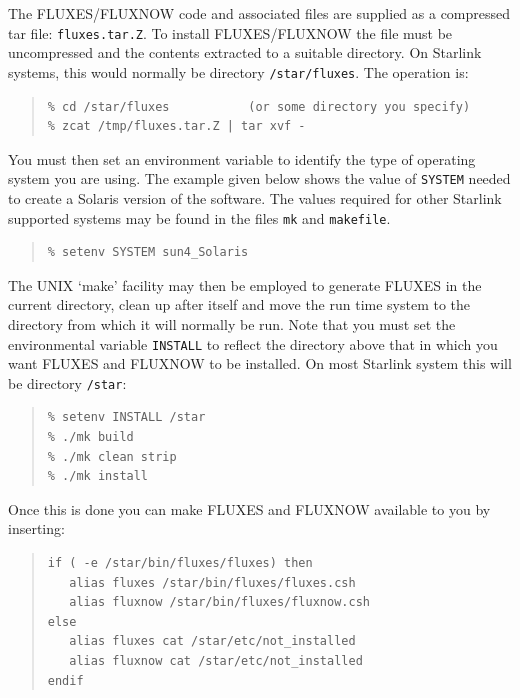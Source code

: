 \documentclass[11pt,twoside]{article}
\newenvironment{myquote}{\begin{quote}\begin{small}}{\end{small}\end{quote}}
\renewcommand{\_}{\texttt{\symbol{95}}}
\begin{document}
The FLUXES/FLUXNOW code and associated files are supplied as a compressed
tar file: {\tt{fluxes.tar.Z}}.  To install FLUXES/FLUXNOW the file must be
uncompressed and the contents extracted to a suitable directory.  On
Starlink systems, this would normally be directory {\tt{/star/fluxes}}. The
operation is:

\begin{myquote}
\begin{verbatim}
% cd /star/fluxes           (or some directory you specify)
% zcat /tmp/fluxes.tar.Z | tar xvf -
\end{verbatim}
\end{myquote}

You must then set an environment variable to identify the type of operating
system you are using. The example given below shows the value of
{\tt{SYSTEM}} needed to create a Solaris version of the software. The values
required for other Starlink supported systems may be found in the files
{\tt{mk}} and {\tt{makefile}}.

\begin{myquote}
\begin{verbatim}
% setenv SYSTEM sun4_Solaris
\end{verbatim}
\end{myquote}

The UNIX `make' facility may then be employed to generate FLUXES in the
current directory, clean up after itself and move the run time system
to the directory from which it will normally be run.  Note that you must
set the environmental variable {\tt{INSTALL}} to reflect the directory
above that in which you want FLUXES and FLUXNOW to be installed. On
most Starlink system this will be directory {\tt{/star}}:

\begin{myquote}
\begin{verbatim}
% setenv INSTALL /star
% ./mk build
% ./mk clean strip
% ./mk install
\end{verbatim}
\end{myquote}

Once this is done you can make FLUXES and FLUXNOW available to you 
by inserting:

\begin{myquote} 
\begin{verbatim}
if ( -e /star/bin/fluxes/fluxes) then
   alias fluxes /star/bin/fluxes/fluxes.csh
   alias fluxnow /star/bin/fluxes/fluxnow.csh
else
   alias fluxes cat /star/etc/not_installed
   alias fluxnow cat /star/etc/not_installed
endif
\end{verbatim}
\end{myquote}
 
\end{document}
